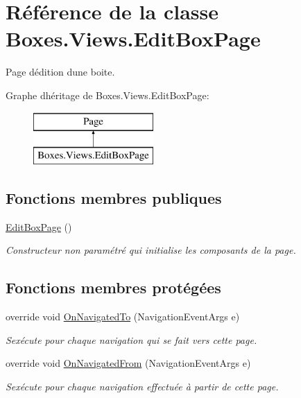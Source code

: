 \hypertarget{class_boxes_1_1_views_1_1_edit_box_page}{}\section{Référence de la classe Boxes.\+Views.\+Edit\+Box\+Page}
\label{class_boxes_1_1_views_1_1_edit_box_page}


Page d\textquotesingle{}édition d\textquotesingle{}une boite.  


Graphe d\textquotesingle{}héritage de Boxes.\+Views.\+Edit\+Box\+Page\+:\begin{figure}[H]
\begin{center}
\leavevmode
\includegraphics[height=2.000000cm]{class_boxes_1_1_views_1_1_edit_box_page}
\end{center}
\end{figure}
\subsection*{Fonctions membres publiques}
\begin{DoxyCompactItemize}
\item 
\hyperlink{class_boxes_1_1_views_1_1_edit_box_page_ad448b698aad1295cc3224f7fe29b4eca}{Edit\+Box\+Page} ()
\begin{DoxyCompactList}\small\item\em Constructeur non paramétré qui initialise les composants de la page. \end{DoxyCompactList}\end{DoxyCompactItemize}
\subsection*{Fonctions membres protégées}
\begin{DoxyCompactItemize}
\item 
override void \hyperlink{class_boxes_1_1_views_1_1_edit_box_page_aff428a93fe95ec07fa73f974ff573e61}{On\+Navigated\+To} (Navigation\+Event\+Args e)
\begin{DoxyCompactList}\small\item\em S\textquotesingle{}exécute pour chaque navigation qui se fait vers cette page. \end{DoxyCompactList}\item 
override void \hyperlink{class_boxes_1_1_views_1_1_edit_box_page_aeb87d28dbffc7223ecc6ec751c1cca11}{On\+Navigated\+From} (Navigation\+Event\+Args e)
\begin{DoxyCompactList}\small\item\em S\textquotesingle{}exécute pour chaque navigation effectuée à partir de cette page. \end{DoxyCompactList}\end{DoxyCompactItemize}
